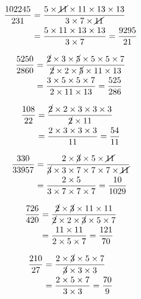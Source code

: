 {{\item\begin{align*}
    \frac{102245}{231} &=
    \frac{5 \times \cancel{11} \times 11 \times 13 \times 13}
    {3 \times 7 \times \cancel{11}}\\ &=
    \frac{5 \times 11 \times 13 \times 13}
    {3 \times 7} =
    \frac{9295}{21}
    \end{align*}

\item\begin{align*}
    \frac{5250}{2860} &=
    \frac{\cancel{2} \times 3 \times \cancel{5} \times 5 \times 5 \times 7}
    {\cancel{2} \times 2 \times \cancel{5} \times 11 \times 13}\\ &=
    \frac{3 \times 5 \times 5 \times 7}
    {2 \times 11 \times 13} =
    \frac{525}{286}
    \end{align*}

\item\begin{align*}
    \frac{108}{22} &=
    \frac{\cancel{2} \times 2 \times 3 \times 3 \times 3}
    {\cancel{2} \times 11}\\ &=
    \frac{2 \times 3 \times 3 \times 3}
    {11} =
    \frac{54}{11}
    \end{align*}

\item\begin{align*}
    \frac{330}{33957} &=
    \frac{2 \times \cancel{3} \times 5 \times \cancel{11}}
    {\cancel{3} \times 3 \times 7 \times 7 \times 7 \times \cancel{11}}\\ &=
    \frac{2 \times 5}
    {3 \times 7 \times 7 \times 7} =
    \frac{10}{1029}
    \end{align*}

\item\begin{align*}
    \frac{726}{420} &=
    \frac{\cancel{2} \times \cancel{3} \times 11 \times 11}
    {\cancel{2} \times 2 \times \cancel{3} \times 5 \times 7}\\ &=
    \frac{11 \times 11}
    {2 \times 5 \times 7} =
    \frac{121}{70}
    \end{align*}

\item\begin{align*}
    \frac{210}{27} &=
    \frac{2 \times \cancel{3} \times 5 \times 7}
    {\cancel{3} \times 3 \times 3}\\ &=
    \frac{2 \times 5 \times 7}
    {3 \times 3} =
    \frac{70}{9}
    \end{align*}

}}
